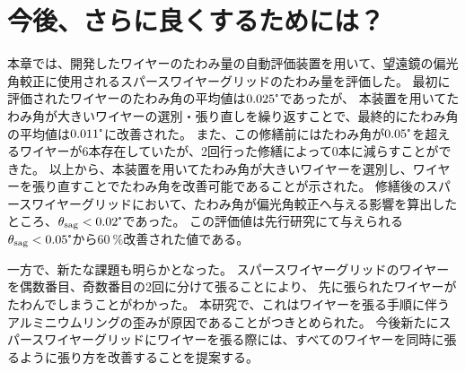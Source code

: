 \documentclass[../../main.tex]{subfiles}
\begin{document}
\section{今後、さらに良くするためには？}
本章では、開発したワイヤーのたわみ量の自動評価装置を用いて、望遠鏡の偏光角較正に使用されるスパースワイヤーグリッドのたわみ量を評価した。
最初に評価されたワイヤーのたわみ角の平均値は$0.025\tcdegree$であったが、
本装置を用いてたわみ角が大きいワイヤーの選別・張り直しを繰り返すことで、最終的にたわみ角の平均値は$0.011\tcdegree$に改善された。
また、この修繕前にはたわみ角が$0.05\tcdegree$を超えるワイヤーが6本存在していたが、2回行った修繕によって0本に減らすことができた。
以上から、本装置を用いてたわみ角が大きいワイヤーを選別し、ワイヤーを張り直すことでたわみ角を改善可能であることが示された。
修繕後のスパースワイヤーグリッドにおいて、たわみ角が偏光角較正へ与える影響を算出したところ、$\theta_{\mathrm{sag}}<0.02\tcdegree$であった。
この評価値は先行研究にて与えられる$\theta_{\mathrm{sag}}<0.05\tcdegree$から$\SI{60}{\%}$改善された値である。

一方で、新たな課題も明らかとなった。
スパースワイヤーグリッドのワイヤーを偶数番目、奇数番目の2回に分けて張ることにより、
先に張られたワイヤーがたわんでしまうことがわかった。
本研究で、これはワイヤーを張る手順に伴うアルミニウムリングの歪みが原因であることがつきとめられた。
今後新たにスパースワイヤーグリッドにワイヤーを張る際には、すべてのワイヤーを同時に張るように張り方を改善することを提案する。
\end{document}

